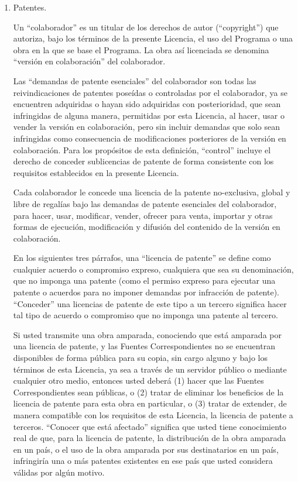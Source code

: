 \documentclass[11pt]{article}
\begin{document}
\begin{enumerate}
\item Patentes.

Un ``colaborador'' es un titular de los derechos de autor (``copyright'') que 
autoriza, bajo los t\'{e}rminos de la presente Licencia, el uso del Programa o 
una obra en la que se base el Programa. La obra as\'{i} licenciada se denomina 
``versi\'{o}n en colaboraci\'{o}n'' del colaborador.

Las ``demandas de patente esenciales'' del colaborador son todas las 
reivindicaciones de patentes pose\'{i}das o controladas por el colaborador, ya 
se encuentren adquiridas o hayan sido adquiridas con posterioridad, que sean 
infringidas de alguna manera, permitidas por esta Licencia, al hacer, usar 
o vender la versi\'{o}n en colaboraci\'{o}n, pero sin incluir demandas que solo sean 
infringidas como consecuencia de modificaciones posteriores de la versi\'{o}n 
en colaboraci\'{o}n. Para los prop\'{o}sitos de esta definici\'{o}n, ``control'' incluye 
el derecho de conceder sublicencias de patente de forma consistente con los 
requisitos establecidos en la presente Licencia.

Cada colaborador le concede una licencia de la patente no-exclusiva, 
global y libre de regal\'{i}as bajo las demandas de patente esenciales del 
colaborador, para hacer, usar, modificar, vender, ofrecer para venta, 
importar y otras formas de ejecuci\'{o}n, modificaci\'{o}n y difusi\'{o}n del 
contenido de la versi\'{o}n en colaboraci\'{o}n.

En los siguientes tres p\'{a}rrafos, una ``licencia de patente'' se define como 
cualquier acuerdo o compromiso expreso, cualquiera que sea su denominaci\'{o}n, 
que no imponga una patente (como el permiso expreso para ejecutar una 
patente o acuerdos para no imponer demandas por infracci\'{o}n de patente). 
``Conceder'' una licencias de patente de este tipo a un tercero significa 
hacer tal tipo de acuerdo o compromiso que no imponga una patente al tercero.

Si usted transmite una obra amparada, conociendo que est\'{a} amparada por 
una licencia de patente, y las Fuentes Correspondientes no se encuentran 
disponibles de forma p\'{u}blica para su copia, sin cargo alguno y bajo los 
t\'{e}rminos de esta Licencia, ya sea a trav\'{e}s de un servidor p\'{u}blico o mediante 
cualquier otro medio, entonces usted deber\'{a} (1) hacer que las Fuentes 
Correspondientes sean p\'{u}blicas, o (2) tratar de eliminar los beneficios de 
la licencia de patente para esta obra en particular, o (3) tratar de 
extender, de manera compatible con los requisitos de esta Licencia, la 
licencia de patente a terceros. ``Conocer que est\'{a} afectado'' significa que 
usted tiene conocimiento real de que, para la licencia de patente, la 
distribuci\'{o}n de la obra amparada en un pa\'{i}s, o el uso de la obra amparada 
por sus destinatarios en un pa\'{i}s, infringir\'{i}a una o m\'{a}s patentes existentes 
en ese pa\'{i}s que usted considera v\'{a}lidas por alg\'{u}n motivo.


\end{enumerate}
\end{document}
